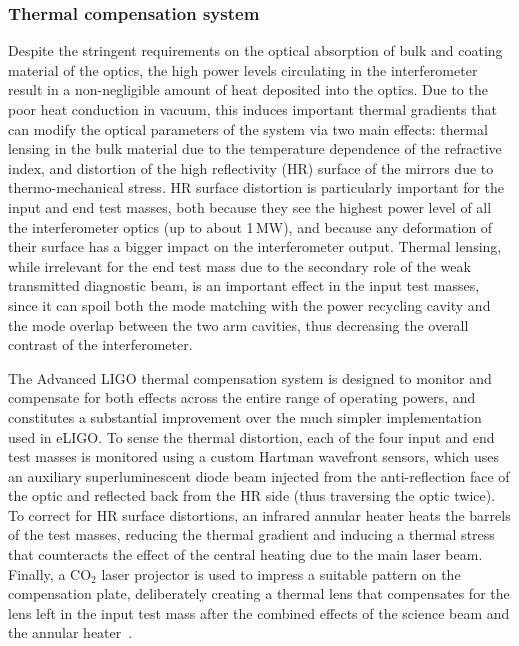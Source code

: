 \subsubsection{Thermal compensation system}
Despite the stringent requirements on the optical absorption of bulk and coating 
material of the optics, the high power levels circulating in the interferometer result 
in a non-negligible amount of heat deposited into the optics.
Due to the poor heat conduction in vacuum, this induces important thermal gradients that can modify 
the optical parameters of the system via two main effects: thermal lensing in the 
bulk material due to the temperature dependence of the refractive index,
and distortion of the high reflectivity (HR) surface of the mirrors due to thermo-mechanical stress.
HR surface distortion is particularly important for the input and end test masses, both because they see the highest power level of all the interferometer optics (up to about 1\,MW), and because any deformation of their surface has a bigger impact on the interferometer output.
Thermal lensing, while irrelevant for the end test mass due to the secondary role of the weak transmitted diagnostic beam, is an important effect in the input test masses, since it can spoil both the mode matching with the power recycling cavity and the mode overlap between the two arm cavities, thus decreasing the overall contrast of the interferometer.

The Advanced LIGO thermal compensation system is designed to monitor and compensate for both effects across the entire range of operating powers, and constitutes a substantial improvement over the much simpler implementation used in eLIGO.
To sense the thermal distortion, each of the four input and end test masses is monitored using a custom Hartman wavefront sensors, which uses an auxiliary superluminescent diode beam injected from the anti-reflection face of the optic and reflected back from the HR side (thus traversing the optic twice).
To correct for HR surface distortions, an infrared annular heater heats the barrels of the test masses, reducing the thermal gradient and inducing a thermal stress that counteracts the effect of the central heating due to the main laser beam.
Finally, a CO$_2$ laser projector is used to impress a suitable pattern on the compensation plate, deliberately creating a thermal lens that compensates for the lens left in the input test mass after the combined effects of the science beam and the annular heater~\cite{TCS_inpreparation}.

